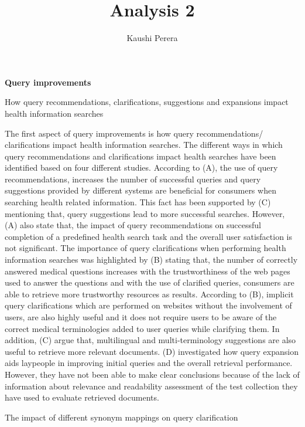 \documentclass[]{article}
\title{Analysis 2}
\author{Kaushi Perera}
\begin{document}
	
\maketitle
	
\textbf{Query improvements}


How query recommendations, clarifications, suggestions and expansions impact health information searches


The first aspect of query improvements is how query recommendations/ clarifications impact health information searches. The different ways in which query recommendations and clarifications impact health searches have been identified based on four different studies. According to (A), the use of query recommendations, increases the number of successful queries and query suggestions provided by different systems are beneficial for consumers when searching health related information. This fact has been supported by (C) mentioning that, query suggestions lead to more successful searches.  However, (A) also state that, the impact of query recommendations on successful completion of a predefined health search task and the overall user satisfaction is not significant. The importance of query clarifications when performing health information searches was highlighted by (B) stating that, the number of correctly answered medical questions increases with the trustworthiness of the web pages used to answer the questions and with the use of clarified queries, consumers are able to retrieve more trustworthy resources as results. According to (B), implicit query clarifications which are performed on websites without the involvement of users, are also highly useful and it does not require users to be aware of the correct medical terminologies added to user queries while clarifying them. In addition, (C) argue that, multilingual and multi-terminology suggestions are also useful to retrieve more relevant documents. (D) investigated how query expansion aids laypeople in improving initial queries and the overall retrieval performance. However, they have not been able to make clear conclusions because of the lack of information about relevance and readability assessment of the test collection they have used to evaluate retrieved documents. 

The impact of different synonym mappings on query clarification
\end{document}
